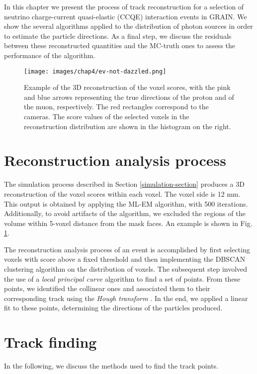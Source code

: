 \label{reco}
In this chapter we present the process of track reconstruction for a selection of neutrino charge-current quasi-elastic (CCQE) interaction events in GRAIN. We show the several algorithms applied to the distribution of photon sources in order to estimate the particle directions. As a final step, we discuss the residuals between these reconstructed quantities and the MC-truth ones to assess the performance of the algorithm.

\begin{figure}
    \centering
    \texttt{[image: images/chap4/ev-not-dazzled.png]}
    \caption{Example of the 3D reconstruction of the voxel scores, with the pink and blue arrows representing the true directions of the proton and of the muon, respectively. The red rectangles correspond to the cameras. The score values of the selected voxels in the reconstruction distribution are shown in the histogram on the right.}
    \label{fig:example-ev}
\end{figure}

\section{Reconstruction analysis process}
The simulation process described in Section \ref{simulation-section} produces a 3D reconstruction of the voxel scores within each voxel. The voxel side is 12 mm. This output is obtained by applying the ML-EM algorithm, with 500 iterations. Additionally, to avoid artifacts of the algorithm, we excluded the regions of the volume within 5-voxel distance from the mask faces. An example is shown in Fig. \ref{fig:example-ev}.

The reconstruction analysis process of an event is accomplished by first selecting voxels with score above a fixed threshold and then implementing the DBSCAN clustering algorithm \cite{DBSCAN} on the distribution of voxels. The subsequent step involved the use of a \textit{local principal curve} algorithm \cite{LPC-algo} to find a set of points. From these points, we identified the collinear ones and associated them to their corresponding track using the \textit{Hough transform} \cite{Hough-transf}. In the end, we applied a linear fit to these points, determining the directions of the particles produced. 

\section{Track finding}
In the following, we discuss the methods used to find the track points.


